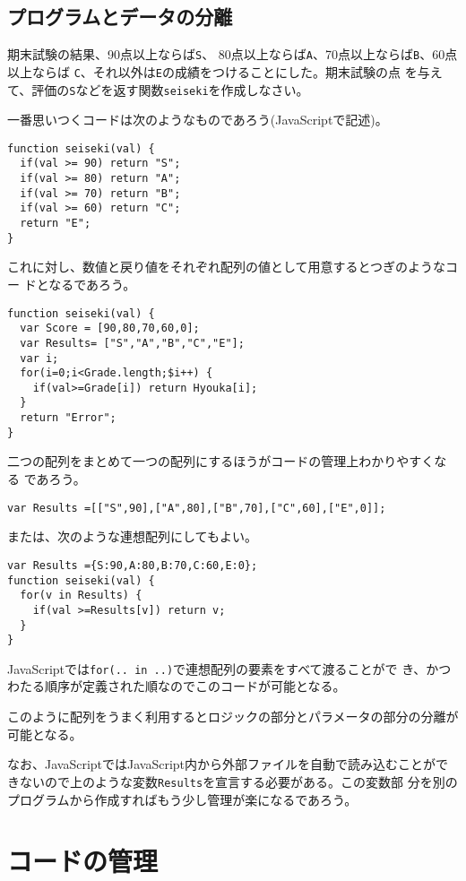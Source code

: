 \subsection{プログラムとデータの分離}
\begin{Exec}\upshape
 期末試験の結果、90点以上ならば\texttt{S}、
 80点以上ならば\texttt{A}、70点以上ならば\texttt{B}、60点以上ならば
 \texttt{C}、それ以外は\texttt{E}の成績をつけることにした。期末試験の点
 を与えて、評価の\texttt{S}などを返す関数\texttt{seiseki}を作成しなさい。
\end{Exec}
一番思いつくコードは次のようなものであろう(JavaScriptで記述)。
\begin{Verbatim}
function seiseki(val) {
  if(val >= 90) return "S";
  if(val >= 80) return "A";
  if(val >= 70) return "B";
  if(val >= 60) return "C";
  return "E";
}
\end{Verbatim}
これに対し、数値と戻り値をそれぞれ配列の値として用意するとつぎのようなコー
ドとなるであろう。
\begin{Verbatim}
function seiseki(val) {
  var Score = [90,80,70,60,0];
  var Results= ["S","A","B","C","E"];
  var i;
  for(i=0;i<Grade.length;$i++) {
    if(val>=Grade[i]) return Hyouka[i];
  }
  return "Error";
}
\end{Verbatim}
二つの配列をまとめて一つの配列にするほうがコードの管理上わかりやすくなる
であろう。
\begin{Verbatim}
var Results =[["S",90],["A",80],["B",70],["C",60],["E",0]];
\end{Verbatim}
または、次のような連想配列にしてもよい。
\begin{Verbatim}
var Results ={S:90,A:80,B:70,C:60,E:0};
function seiseki(val) {
  for(v in Results) {
    if(val >=Results[v]) return v;
  }
}
\end{Verbatim}
JavaScriptでは\texttt{for(.. in ..)}で連想配列の要素をすべて渡ることがで
き、かつわたる順序が定義された順なのでこのコードが可能となる。

このように配列をうまく利用するとロジックの部分とパラメータの部分の分離が
可能となる。

なお、JavaScriptではJavaScript内から外部ファイルを自動で読み込むことがで
きないので上のような変数\texttt{Results}を宣言する必要がある。この変数部
分を別のプログラムから作成すればもう少し管理が楽になるであろう。


\section{コードの管理}
